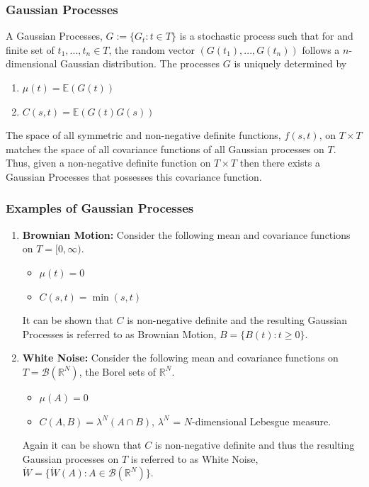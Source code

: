 \documentclass[11pt]{beamer}
\title[About Beamer] %
{}
\subtitle{Nick Eisenbergs Comprehensive Presentation}
\author[] %
{ }
\date[Fall 2020] %
{Fall 2020}
\numberwithin{equation}{section}
\newcommand{\R}{\mathbb{R}}
\newcommand{\E}{\mathbb{E}}
\begin{document}
\frame{\titlepage}

\begin{frame}[t]
\frametitle{Gaussian Processes}

A Gaussian Processes, $G := \{G_t : t \in T\}$ is a stochastic process such that for and finite set of $t_1,...,t_n \in T$, the random vector $(G(t_1),...,G(t_n))$ follows a $n$-dimensional Gaussian distribution. The processes $G$ is uniquely determined by
\begin{enumerate}
		\item $\mu(t) = \E(G(t))$
		\item $C(s,t) = \E(G(t)G(s))$
\end{enumerate}

\begin{theorem}[Important]
	The space of all symmetric and non-negative definite functions, $f(s,t)$, on $T\times T$ matches the space of all covariance functions of all Gaussian processes on $T$. Thus, given a non-negative definite function on $T \times T$ then there exists a Gaussian Processes that possesses this covariance function.
\end{theorem}
\end{frame}

\begin{frame}[t]
\frametitle{Examples of Gaussian Processes}
\begin{enumerate}
	\item \textbf{Brownian Motion:} Consider the following mean and covariance functions on $T=[0, \infty)$.
			\begin{itemize}
				\item $\mu(t) = 0$
				\item $C(s,t) = \min(s,t)$
			\end{itemize}
		It can be shown that $C$ is non-negative definite and the resulting Gaussian Processes is referred to as Brownian Motion, $B= \{ B(t) : t \ge 0 \}$.

	\item \textbf{White Noise:} Consider the following mean and covariance functions on $T=\mathscr{B}(\R^N)$, the Borel sets of $\R^N$.
		\begin{itemize}
			\item $\mu(A) = 0$
			\item $C(A,B) = \lambda^N(A \cap B)$, $\lambda^N$ = $N$-dimensional Lebesgue measure.
		\end{itemize}
	Again it can be shown that $C$ is non-negative definite and thus the resulting Gaussian processes on $T$ is referred to as White Noise, $\dot{W} = \{ \dot{W}(A) : A \in \mathscr{B}(\R^N)  \}$.
\end{enumerate}
\end{frame}
\end{document}

